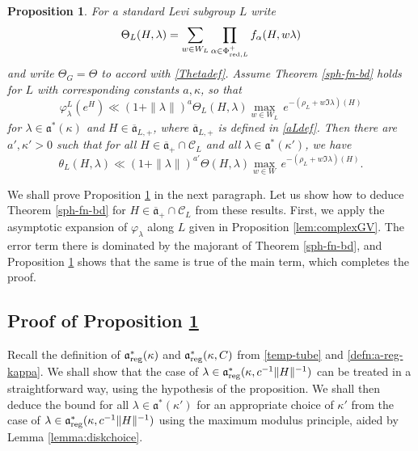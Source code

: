 \documentclass[12pt]{amsart}
\newtheorem{prop}[theorem]{Proposition}
\theoremstyle{remark}
\newcommand{\ga}{\mathfrak a}
\begin{document}
\begin{prop}\label{prop:Lmainbd}
For a standard Levi subgroup $L$ write
\begin{equation}\label{def:ThetaL}
\Theta_L(H, \lambda) = \sum_{w \in W_L} \prod_{ \alpha \in \Phi_{\textnormal{red},L}^+} f_\alpha(H,w\lambda)
\end{equation}
and write $\Theta_G=\Theta$ to accord with \eqref{Thetadef}. Assume Theorem \ref{sph-fn-bd} holds for $L$ with corresponding constants $a, \kappa$, so that
\[
\varphi^L_\lambda(e^H) \ll (1 + \| \lambda \|)^{a} \Theta_L(H, \lambda) \underset{w \in W_L}{\max} \, e^{-(\rho_L + w \Im \lambda)(H)}
\]
for $\lambda \in \ga^*(\kappa)$ and $H \in \overline{\ga}_{L,+}$, where $\overline{\ga}_{L,+}$ is defined in \eqref{aLdef}.  Then there are $a', \kappa' > 0$ such that for all $H \in \overline{\ga}_+\cap \mathcal{C}_L$ and all $\lambda \in \ga^*(\kappa')$, we have
\[
\theta_L(H, \lambda) \ll (1 + \| \lambda \|)^{a'} \Theta(H, \lambda) \underset{w \in W}{\max} \, e^{-(\rho_L + w \Im \lambda)(H)}.
\]
\end{prop}

We shall prove Proposition \ref{prop:Lmainbd} in the next paragraph.  Let us show how to deduce Theorem \ref{sph-fn-bd} for $H \in \overline{\ga}_+ \cap \mathcal{C}_{L}$ from these results.  First, we apply the asymptotic expansion of $\varphi_\lambda$ along $L$ given in Proposition \ref{lem:complexGV}. The error term there is dominated by the majorant of Theorem \ref{sph-fn-bd}, and Proposition \ref{prop:Lmainbd} shows that the same is true of the main term, which completes the proof.

\subsection{Proof of Proposition \ref{prop:Lmainbd}}
\label{sec:Lmainbd}

Recall the definition of $\mathfrak{a}_{\rm reg}^*(\kappa)$ and $\mathfrak{a}_{\rm reg}^* (\kappa,C)$ from \eqref{temp-tube} and \eqref{defn:a-reg-kappa}. We shall show that the case of $\lambda \in \mathfrak{a}_{\rm reg}^* (\kappa,c^{-1} \|H\|^{-1})$ can be treated in a straightforward way, using the hypothesis of the proposition. We shall then deduce the bound for all $\lambda \in \mathfrak{a}^*(\kappa')$ for an appropriate choice of $\kappa'$ from the case of $\lambda \in \mathfrak{a}_{\rm reg}^*(\kappa,c^{-1}\|H\|^{-1})$ using the maximum modulus principle, aided by Lemma \ref{lemma:diskchoice}.
\end{document}
